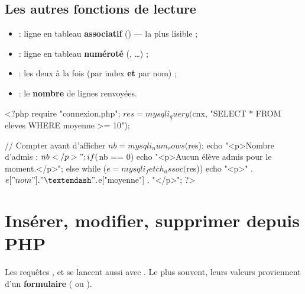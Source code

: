 
\subsection{Les autres fonctions de lecture}

\begin{itemize}
  \item {} : ligne en tableau \textbf{associatif}
  () — la plus lisible ;
  \item {} : ligne en tableau \textbf{numéroté}
  (, \dots) ;
  \item {} : les deux à la fois (par index
  \textbf{et} par nom) ;
  \item {} : le \textbf{nombre} de lignes
  renvoyées.
\end{itemize}

\begin{codephp}
<?php
  require "connexion.php";
  $res = mysqli_query($cnx, "SELECT * FROM eleves WHERE moyenne >= 10");

  // Compter avant d'afficher
  $nb = mysqli_num_rows($res);
  echo "<p>Nombre d'admis : $nb</p>";

  if ($nb == 0) {
    echo "<p>Aucun élève admis pour le moment.</p>";
  } else {
    while ($e = mysqli_fetch_assoc($res)) {
      echo "<p>" . $e["nom"] . " — " . $e["moyenne"] . "</p>";
    }
  }
?>
\end{codephp}

\section{Insérer, modifier, supprimer depuis PHP}

Les requêtes ,  et  se lancent aussi avec
. Le plus souvent, leurs valeurs proviennent d'un
\textbf{formulaire} ( ou ).

